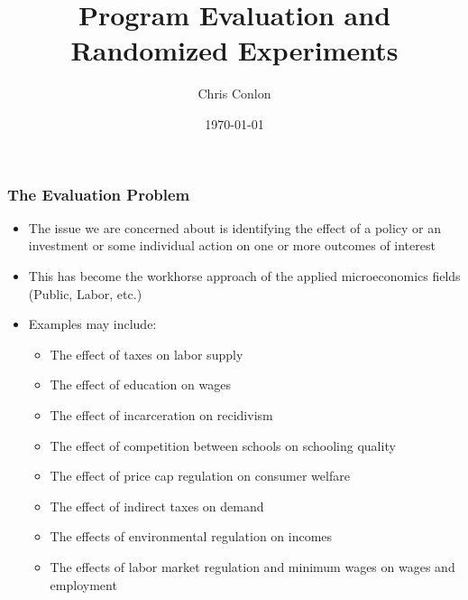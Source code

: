 \documentclass[aspectratio=169,11pt]{beamer}
\title{Program Evaluation and Randomized Experiments}
\author{Chris Conlon}
\institute{Applied Econometrics}
\date{\today}
\begin{document}
\frame{\titlepage}


\begin{frame}
\frametitle{The Evaluation Problem}
\begin{itemize}
\item The issue we are concerned about is identifying the effect of a policy or an investment or some individual action on one or more outcomes of interest
\item This has become the workhorse approach of the applied microeconomics fields (Public, Labor, etc.)
\item Examples may include:
\begin{itemize}
\item The effect of taxes on labor supply
\item The effect of education on wages
\item The effect of incarceration on recidivism
\item The effect of competition between schools on schooling quality
\item The effect of price cap regulation on consumer welfare
\item The effect of indirect taxes on demand
\item The effects of environmental regulation on incomes
\item The effects of labor market regulation and minimum wages on wages and employment
\end{itemize}
\end{itemize}
\end{frame}
\end{document}

